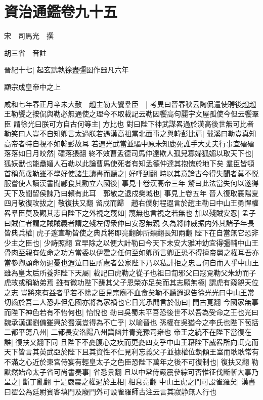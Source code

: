 \chapter{資治通鑑卷九十五}
宋　司馬光　撰

胡三省　音註

晉紀十七|{
	起玄黓執徐盡彊圉作噩凡六年}


顯宗成皇帝中之上

咸和七年春正月辛未大赦　趙主勒大饗羣臣　|{
	考異曰晉春秋云陶侃遣使聘後趙趙王勒饗之按侃與勒必無通使之理今不取載記云勒因饗高句麗宇文屋孤使今但云饗羣臣}
謂徐光曰朕可方自古何等主|{
	方比也}
對曰陛下神武謀畧過於漢高後世無可比者勒笑曰人豈不自知卿言太過朕若遇漢高祖當北面事之與韓彭比肩|{
	戴溪曰勒豈真知高帝者特自視不如韓彭故耳}
若遇光武當並驅中原未知鹿死誰手大丈夫行事宜礌礌落落如日月皎然|{
	礌落猥翻}
終不效曹孟德司馬仲達欺人孤兒寡婦狐媚以取天下也|{
	狐妖獸也能蠱媚人石勒以此論曹馬使死者有知孟德仲達其抱愧於地下矣}
羣臣皆頓首稱萬歲勒雖不學好使諸生讀書而聽之|{
	好呼到翻}
時以其意論古今得失聞者莫不悦服嘗使人讀漢書聞酈食其勸立六國後|{
	事見十卷漢高帝三年}
驚曰此法當失何以遂得天下及聞留侯諫乃曰賴有此耳　郭敬之退戍樊城也|{
	事見上卷五年}
晉人復取襄陽夏四月敬復攻拔之|{
	敬復扶又翻}
留戍而歸　趙右僕射程遐言於趙主勒曰中山王勇悍權畧羣臣莫及觀其志自陛下之外視之蔑如|{
	蔑無也言視之若無也}
加以殘賊安忍|{
	孟子曰賊仁者謂之賊賊義者謂之殘左傳衆仲曰安忍無親}
久為將帥威振内外其諸子年長皆典兵權|{
	虎子邃宣勒皆使之典兵將即亮翻帥所類翻長知兩翻}
陛下在自當無它恐非少主之臣也|{
	少詩照翻}
宜早除之以便大計勒曰今天下未安大雅冲幼宜得彊輔中山王骨肉至親有佐命之功方當委以伊霍之任何至如卿所言卿正恐不得擅帝舅之權耳吾亦當參卿顧命勿過憂也遐泣曰臣所慮者公家陛下乃以私計拒之忠言何自而入乎中山王雖為皇太后所養非陛下天屬|{
	載記曰虎勒之從子也祖曰㔨邪父曰寇覔勒父朱幼而子虎故或稱勒弟焉}
雖有微功陛下酬其父子恩榮亦足矣而其志願無極|{
	謂虎有窺覦天位之志}
豈將來有益者乎若不除之臣見宗廟不血食矣勒不聽遐退告徐光光曰中山王常切齒於吾二人恐非但危國亦將為家禍也它日光承閒言於勒曰|{
	閒古莧翻}
今國家無事而陛下神色若有不怡何也|{
	怡悅也}
勒曰吳蜀未平吾恐後世不以吾為受命之王也光曰魏承漢運劉備雖興於蜀漢豈得為不亡乎|{
	以喻晉也}
孫權在吳猶今之李氏也陛下苞括二都平蕩八州|{
	二都長安洛陽八州冀幽并青兖豫司雍也}
帝王之統不在陛下當復在誰|{
	復扶又翻下同}
且陛下不憂腹心之疾而更憂四支乎中山王藉陛下威畧所向輒克而天下皆言其英武亞於陛下且其資性不仁見利忘義父子並據權位埶傾王室而耿耿常有不滿之心近於東宮侍宴有輕皇太子之色臣恐陛下萬年之後不可復制也|{
	復扶又翻}
勒默然始命太子省可尚書奏事|{
	省悉景翻}
且以中常侍嚴震參綜可否惟征伐斷斬大事乃呈之|{
	斷丁亂翻}
于是嚴震之權過於主相|{
	相息亮翻}
中山王虎之門可設雀羅矣|{
	漢書曰翟公為廷尉賓客填門及廢門外可設雀羅師古注云言其寂静無人行也}
